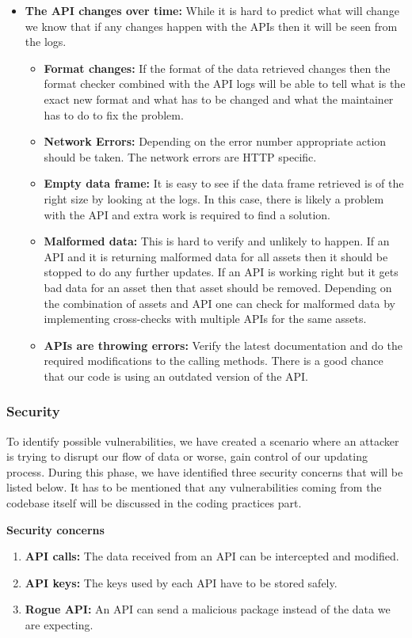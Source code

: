 \documentclass[main.tex]{subfiles}
\begin{document}
\begin{itemize}
    \item \textbf{The API changes over time: }
    While it is hard to predict what will change we know that if any changes happen with the APIs then it will be seen from the logs. 
    \begin{itemize}
        \item \textbf{Format changes:} If the format of the data retrieved changes then the format checker combined with the API logs will be able to tell what is the exact new format and what has to be changed and what the maintainer has to do to fix the problem.
        \item \textbf{Network Errors:}  Depending on the error number appropriate action should be taken. The network errors are HTTP specific. 
        \item \textbf{Empty data frame:} It is easy to see if the data frame retrieved is of the right size by looking at the logs. In this case, there is likely a problem with the API and extra work is required to find a solution.
        \item \textbf{Malformed data:} This is hard to verify and unlikely to happen.  If an API and it is returning malformed data for all assets then it should be stopped to do any further updates. If an API is working right but it gets bad data for an asset then that asset should be removed. Depending on the combination of assets and API one can check for malformed data by implementing cross-checks with multiple APIs for the same assets.
        \item \textbf{APIs are throwing errors:} Verify the latest documentation and do the required modifications to the calling methods. There is a good chance that our code is using an outdated version of the API.
    \end{itemize}
\end{itemize}

\subsubsection{Security}
To identify possible vulnerabilities, we have created a scenario where an attacker is trying to disrupt our flow of data or worse, gain control of our updating process. During this phase, we have identified three security concerns that will be listed below. It has to be mentioned that any vulnerabilities coming from the codebase itself will be discussed in the coding practices part.\newline

\textbf{Security concerns}
\begin{enumerate}
    \item \textbf{API calls:} The data received from an API can be intercepted and modified.
    \item \textbf{API keys:} The keys used by each API have to be stored safely.
    \item \textbf{Rogue API:} An API can send a malicious package instead of the data we are expecting.
\end{enumerate}
\end{document}
